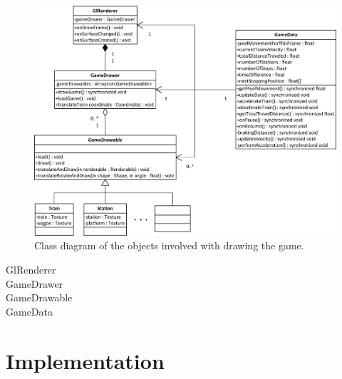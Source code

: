 \begin{figure}[H]
\centering
\includegraphics[width=0.9\linewidth]{img/game.png}%
\caption{Class diagram of the objects involved with drawing the game.}
\label{fig:game}
\end{figure}

\begin{description}
\item[GlRenderer] 
\item[GameDrawer] 
\item[GameDrawable] 
\item[GameData] 
\end{description}

\section{Implementation}

